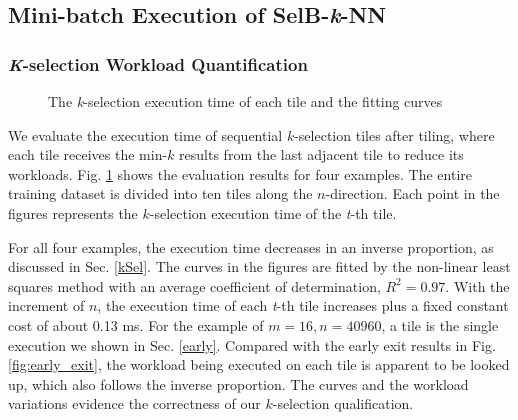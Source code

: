 \documentclass[12pt]{extbook}
\begin{document}
\subsection{Mini-batch Execution of SelB-\textit{k}-NN}

\subsubsection{\textit{K}-selection Workload Quantification}

\begin{figure}[tbp]
    \caption{The \textit{k}-selection execution time of each tile and the fitting curves}
    \label{fig:verified}
    \end{figure}

We evaluate the execution time of sequential $k$-selection tiles after tiling, where each tile receives the min-$k$ results from the last adjacent tile to reduce its workloads. Fig. \ref{fig:verified} shows the evaluation results for four examples. The entire training dataset is divided into ten tiles along the $n$-direction. Each point in the figures represents the $k$-selection execution time of the \textit{t}-th tile.

For all four examples, the execution time decreases in an inverse proportion, as discussed in Sec. \ref{kSel}. The curves in the figures are fitted by the non-linear least squares method with an average coefficient of determination, $R^{2} = 0.97$. With the increment of $n$, the execution time of each \textit{t}-th tile increases plus a fixed constant cost of about 0.13 ms. For the example of $m = 16, n = 40960$, a tile is the single execution we shown in Sec. \ref{early}. Compared with the early exit results in Fig. \ref{fig:early_exit}, the workload being executed on each tile is apparent to be looked up, which also follows the inverse proportion. The curves and the workload variations evidence the correctness of our $k$-selection qualification.
\end{document}
